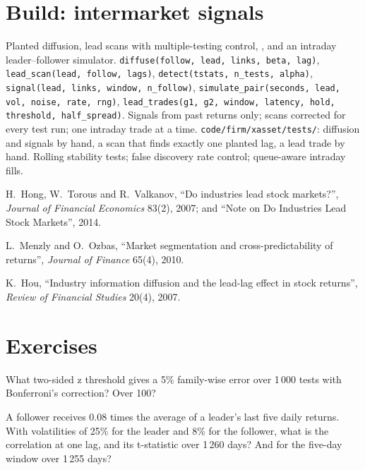 \section{Build: intermarket signals}\label{bld:s1:cross-asset-lead-lag:xasset}

\begin{build}
 Planted diffusion, lead scans with multiple-testing control, , and an intraday leader--follower simulator.
 \texttt{diffuse(follow, lead, links, beta, lag)}, \texttt{lead\_scan(lead, follow, lags)}, \texttt{detect(tstats, n\_tests, alpha)},
\texttt{signal(lead, links, window, n\_follow)}, \texttt{simulate\_pair(seconds, lead, vol, noise, rate, rng)}, \texttt{lead\_trades(g1, g2, window,
latency, hold, threshold, half\_spread)}.
 Signals from past returns only; scans corrected for every test run; one intraday trade at a time.
 \texttt{code/firm/xasset/tests/}: diffusion and signals by hand, a scan that finds exactly one planted lag, a lead trade by
hand.
 Rolling stability tests; false discovery rate control; queue-aware intraday fills.
\end{build}

\begin{omsources}
\item H.~Hong, W.~Torous and R.~Valkanov, ``Do industries lead stock markets?'', \emph{Journal of Financial Economics} 83(2), 2007; and ``Note on Do
Industries Lead Stock Markets'', 2014.
\item L.~Menzly and O.~Ozbas, ``Market segmentation and cross-predictability of returns'', \emph{Journal of Finance} 65(4), 2010.
\item K.~Hou, ``Industry information diffusion and the lead-lag effect in stock returns'', \emph{Review of Financial Studies} 20(4), 2007.
\end{omsources}

\section{Exercises}

\begin{exercise}[$\star$]\label{exo:s1:cross-asset-lead-lag:1}
What two-sided z threshold gives a 5\% family-wise error over 1\,000 tests with Bonferroni's correction? Over 100?
\end{exercise}

\begin{exercise}[$\star$]\label{exo:s1:cross-asset-lead-lag:2}
A follower receives 0.08 times the average of a leader's last five daily returns. With volatilities of 25\% for the leader and 8\% for the follower, what
is the correlation at one lag, and its t-statistic over 1\,260 days? And for the five-day window over 1\,255 days?
\end{exercise}

